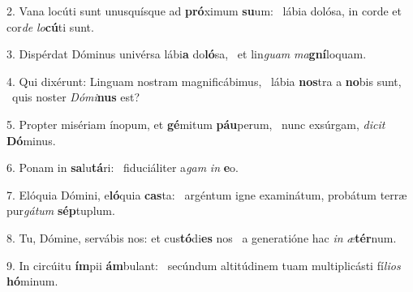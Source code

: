 2. Vana locúti sunt unusquísque ad \textbf{pró}ximum \textbf{su}um: \ast\  lábia dolósa, in corde et cor\textit{de} \textit{lo}\textbf{cú}ti sunt.\

3. Dispérdat Dóminus univérsa lábi\textbf{a} do\textbf{ló}sa, \ast\  et lin\textit{guam} \textit{ma}\textbf{gní}loquam.\

4. Qui dixérunt: Linguam nostram magnificábimus, \dag\  lábia \textbf{nos}tra a \textbf{no}bis sunt, \ast\  quis noster \textit{Dó}\textit{mi}\textbf{nus} est?\

5. Propter misériam ínopum, et \textbf{gé}mitum \textbf{páu}perum, \ast\  nunc exsúrgam, \textit{di}\textit{cit} \textbf{Dó}minus.\

6. Ponam in \textbf{sa}lu\textbf{tá}ri: \ast\  fiduciáliter a\textit{gam} \textit{in} \textbf{e}o.\

7. Elóquia Dómini, e\textbf{ló}quia \textbf{cas}ta: \ast\  argéntum igne examinátum, probátum terræ pur\textit{gá}\textit{tum} \textbf{sép}tuplum.\

8. Tu, Dómine, servábis nos: et cus\textbf{tó}di\textbf{es} nos \ast\  a generatióne hac \textit{in} \textit{æ}\textbf{tér}num.\

9. In circúitu \textbf{ím}pii \textbf{ám}bulant: \ast\  secúndum altitúdinem tuam multiplicásti fí\textit{li}\textit{os} \textbf{hó}minum.\

